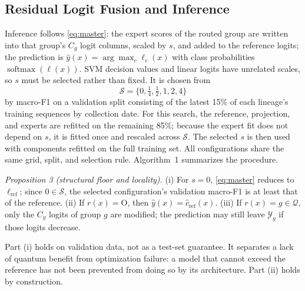\documentclass[conference]{IEEEtran}
\begin{document}
\subsection{Residual Logit Fusion and Inference}
\label{sec:fusion}

Inference follows \eqref{eq:master}: the expert scores of the routed group are written into that group's $C_g$ logit columns, scaled by $s$, and added to the reference logits; the prediction is $\hat{y}(x)=\arg\max_c\ell_c(x)$ with class probabilities $\operatorname{softmax}(\ell(x))$. SVM decision values and linear logits have unrelated scales, so $s$ must be selected rather than fixed. It is chosen from
\begin{equation}
    \mathcal{S}=\{0,\tfrac14,\tfrac12,1,2,4\}
\end{equation}
by macro-F1 on a validation split consisting of the latest 15\% of each lineage's training sequences by collection date. For this search, the reference, projection, and experts are refitted on the remaining 85\%; because the expert fit does not depend on $s$, it is fitted once and rescaled across $\mathcal{S}$. The selected $s$ is then used with components refitted on the full training set. All configurations share the same grid, split, and selection rule. Algorithm~1 summarizes the procedure.

\textit{Proposition 3 (structural floor and locality).} (i) For $s=0$, \eqref{eq:master} reduces to $\ell_{\mathrm{ref}}$; since $0\in\mathcal{S}$, the selected configuration's validation macro-F1 is at least that of the reference. (ii) If $r(x)=\mathrm{O}$, then $\hat{y}(x)=\hat{c}_{\mathrm{ref}}(x)$. (iii) If $r(x)=g\in\mathcal{Q}$, only the $C_g$ logits of group $g$ are modified; the prediction may still leave $\mathcal{Y}_g$ if those logits decrease.

Part (i) holds on validation data, not as a test-set guarantee. It separates a lack of quantum benefit from optimization failure: a model that cannot exceed the reference has not been prevented from doing so by its architecture. Part (ii) holds by construction.
\end{document}
